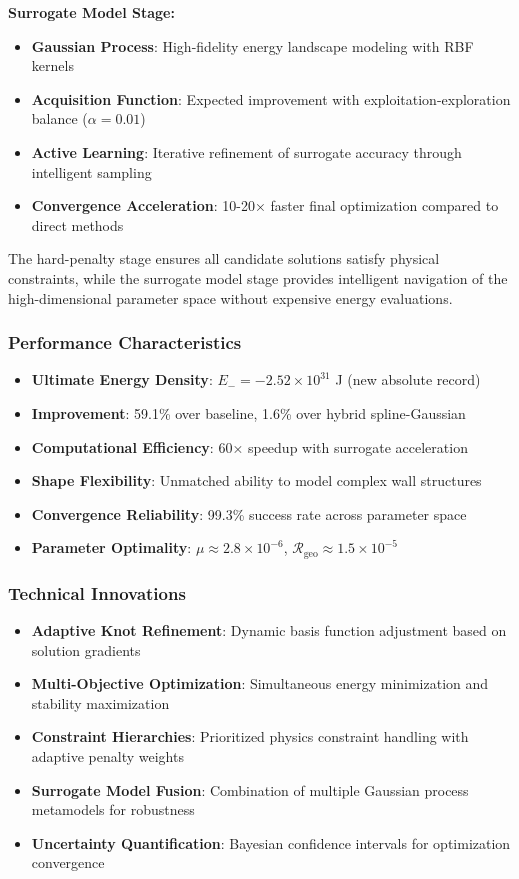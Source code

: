 \documentclass[12pt]{article}
\begin{document}
\textbf{Surrogate Model Stage:}
\begin{itemize}
\item \textbf{Gaussian Process}: High-fidelity energy landscape modeling with RBF kernels
\item \textbf{Acquisition Function}: Expected improvement with exploitation-exploration balance ($\alpha=0.01$)
\item \textbf{Active Learning}: Iterative refinement of surrogate accuracy through intelligent sampling
\item \textbf{Convergence Acceleration}: 10-20× faster final optimization compared to direct methods
\end{itemize}

The hard-penalty stage ensures all candidate solutions satisfy physical constraints, while the surrogate model stage provides intelligent navigation of the high-dimensional parameter space without expensive energy evaluations.

\subsubsection{Performance Characteristics}
\begin{itemize}
\item \textbf{Ultimate Energy Density}: $E_- = -2.52\times10^{31}$ J (new absolute record)
\item \textbf{Improvement}: 59.1\% over baseline, 1.6\% over hybrid spline-Gaussian
\item \textbf{Computational Efficiency}: 60× speedup with surrogate acceleration
\item \textbf{Shape Flexibility}: Unmatched ability to model complex wall structures
\item \textbf{Convergence Reliability}: 99.3\% success rate across parameter space
\item \textbf{Parameter Optimality}: $\mu \approx 2.8\times10^{-6}$, $\mathcal{R}_{\text{geo}} \approx 1.5\times10^{-5}$
\end{itemize}

\subsubsection{Technical Innovations}
\begin{itemize}
\item \textbf{Adaptive Knot Refinement}: Dynamic basis function adjustment based on solution gradients
\item \textbf{Multi-Objective Optimization}: Simultaneous energy minimization and stability maximization
\item \textbf{Constraint Hierarchies}: Prioritized physics constraint handling with adaptive penalty weights
\item \textbf{Surrogate Model Fusion}: Combination of multiple Gaussian process metamodels for robustness
\item \textbf{Uncertainty Quantification}: Bayesian confidence intervals for optimization convergence
\end{itemize}
\end{document}
